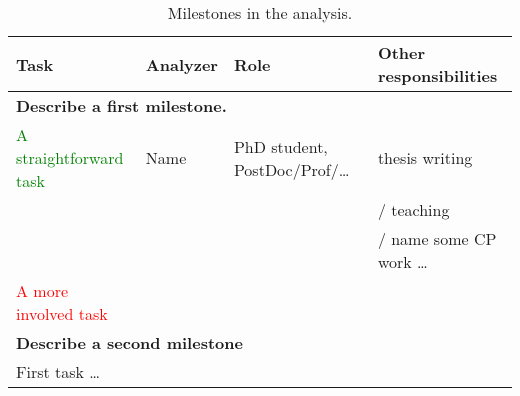 \begin{table}[ht]
  \caption{Milestones in the analysis.}%
  \label{tab:Miles_Ahead} 
\begin{tabular}{llll} 
  \toprule
  \textbf{Task} & \textbf{Analyzer} & \textbf{Role} & \textbf{Other responsibilities} \\
  \midrule
  \multicolumn{4}{p{\textwidth}}{\textbf{Describe a first milestone.}} \\
  \midrule
  \textcolor{green}{A straightforward task}       & Name         & PhD student, PostDoc/Prof/\ldots & thesis writing \\
  &&& / teaching \\
  &&& / name some CP work \ldots \\ 
  \textcolor{red}{A more involved task}      &    &    &  \\ 
  \bottomrule
  
  \multicolumn{4}{l}{\textbf{Describe a second milestone}} \\
  \midrule
  First task \ldots      &          &  &  \\ 
  \bottomrule
\end{tabular}
\end{table}



